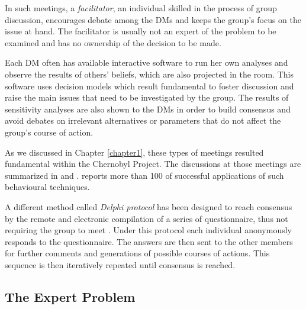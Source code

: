 In such meetings, a \textit{facilitator}, an individual skilled in the process of group discussion, encourages debate among the \glspl{DM} and keeps the group's focus on the issue at hand. The facilitator is usually not an expert of the problem to be examined and has no ownership of the decision to be made. 

Each \gls{DM} often has available interactive software to run her own analyses and observe the results of others' beliefs, which are also projected in the room. This software uses decision models which result fundamental to foster discussion and raise the main issues that need to be investigated by the group. The results of sensitivity analyses are also shown to the \glspl{DM} in order to build consensus and avoid debates on irrelevant alternatives or parameters that do not affect the group's course of action. 

As we discussed in Chapter \ref{chapter1}, these types of meetings resulted fundamental within the Chernobyl Project. The discussions at those meetings are summarized in \citet{French2009} and \citet{Smith2010}. \citet{Ackermann1996} reports more than 100 of successful applications of such behavioural techniques. 

A different method called \textit{Delphi protocol} has been designed to reach consensus by the remote and electronic compilation of a series of questionnaire, thus not requiring the group to meet \citep{Dalkey1963,Linstone1975}. Under this protocol each individual anonymously responds to the questionnaire. The answers are then sent to the other members for further comments and generations of possible courses of actions. This sequence is then iteratively repeated until consensus is reached. 
 
\subsection{The Expert Problem}
\label{sec:expert}

